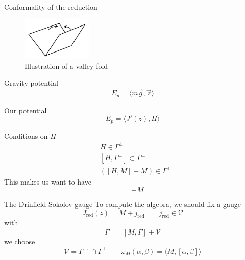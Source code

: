 \documentclass{beamer}
\begin{document}
\begin{frame}{Conformality of the reduction}
    \begin{figure}
        \centering
        \includegraphics[width=0.3\textwidth]{valleyfold}
        \caption{Illustration of a valley fold}
    \end{figure}
    \begin{alertblock}{Gravity potential} 
        \begin{equation}
            E_p = \langle m\vec{g}, \vec{z} \rangle
        \end{equation}
    \end{alertblock}
    \begin{alertblock}{Our potential}
        \begin{equation}
            E_p = \langle J'(z), H\rangle
        \end{equation}
    \end{alertblock}
\end{frame}


\begin{frame}{Conditions on $H$} \huge
    \begin{equation}
        \begin{aligned}
            &H \in \Gamma^\perp \\
            &[H, \Gamma^\perp] \subset \Gamma^\perp\\ 
            &([H, M] + M) \in \Gamma^\perp
        \end{aligned}
    \end{equation}
    This makes us want to have 
    \begin{equation}
        [H, M] = -M
    \end{equation}
\end{frame}

\begin{frame}{The Drinfield-Sokolov gauge} \Large
    To compute the algebra, we should fix a gauge
    \begin{equation}
        J_{\text{red}}(z) = M + j_{\text{red}} \qquad j_{\text{red}} \in \mathcal{V}
    \end{equation}
    with 
    \begin{equation}
        \Gamma^\perp = [M, \Gamma] + \mathcal{V}
    \end{equation}
    we choose
    \begin{equation}
        \mathcal{V} = \Gamma^{\perp_\omega} \cap \Gamma^\perp \qquad \omega_M(\alpha, \beta) = \langle M, [\alpha, \beta]\rangle
    \end{equation}
\end{frame}
\end{document}
